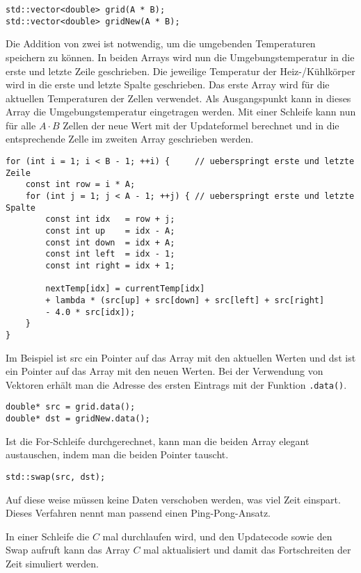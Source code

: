 \begin{lstlisting}
std::vector<double> grid(A * B);
std::vector<double> gridNew(A * B);
\end{lstlisting}
Die Addition von zwei ist notwendig, um die umgebenden Temperaturen speichern zu können.
In beiden Arrays wird nun die Umgebungstemperatur in die erste und letzte Zeile geschrieben.
Die jeweilige Temperatur der Heiz-/Kühlkörper wird in die erste und letzte Spalte geschrieben.
Das erste Array wird für die aktuellen Temperaturen der Zellen verwendet.
Als Ausgangspunkt kann in dieses Array die Umgebungstemperatur eingetragen werden.
Mit einer Schleife kann nun für alle $A \cdot B$ Zellen der neue Wert mit der Updateformel berechnet und in die entsprechende Zelle im zweiten Array geschrieben werden.
\begin{lstlisting}[caption={Update-Schritt (seriell)},label={parallelisierung:code:updateSeriel}]
for (int i = 1; i < B - 1; ++i) {     // ueberspringt erste und letzte Zeile
	const int row = i * A;
	for (int j = 1; j < A - 1; ++j) { // ueberspringt erste und letzte Spalte
		const int idx   = row + j;
		const int up    = idx - A;
		const int down  = idx + A;
		const int left  = idx - 1;
		const int right = idx + 1;
		
		nextTemp[idx] = currentTemp[idx]
		+ lambda * (src[up] + src[down] + src[left] + src[right]
		- 4.0 * src[idx]);
	}
}
\end{lstlisting}
Im Beispiel ist src ein Pointer auf das Array mit den aktuellen Werten und dst ist ein Pointer auf das Array mit den neuen Werten.
Bei der Verwendung von Vektoren erhält man die Adresse des ersten Eintrags mit der Funktion \texttt{.data()}.
\begin{lstlisting}
double* src = grid.data();
double* dst = gridNew.data();
\end{lstlisting}

Ist die For-Schleife durchgerechnet, kann man die beiden Array elegant austauschen, indem man die beiden Pointer tauscht.
\begin{lstlisting}
std::swap(src, dst);
\end{lstlisting}
Auf diese weise müssen keine Daten verschoben werden, was viel Zeit einspart.
Dieses Verfahren nennt man passend einen Ping-Pong-Ansatz.

In einer Schleife die $C$ mal durchlaufen wird, und den Updatecode sowie den Swap aufruft kann das Array $C$ mal aktualisiert und damit das Fortschreiten der Zeit simuliert werden.


